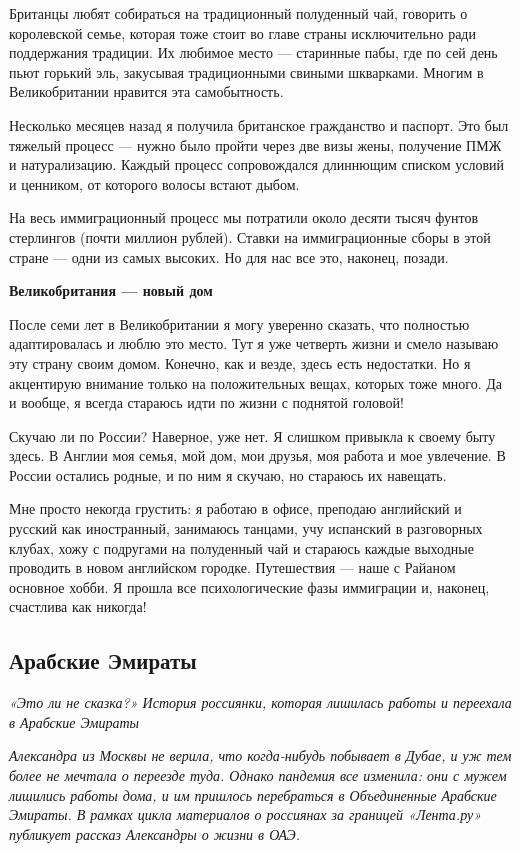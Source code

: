 Британцы любят собираться на традиционный полуденный чай, говорить о королевской семье, которая тоже стоит во главе страны исключительно ради поддержания традиции. Их любимое место — старинные пабы, где по сей день пьют горький эль, закусывая традиционными свиными шкварками. Многим в Великобритании нравится эта самобытность.

Несколько месяцев назад я получила британское гражданство и паспорт. Это был тяжелый процесс — нужно было пройти через две визы жены, получение ПМЖ и натурализацию. Каждый процесс сопровождался длиннющим списком условий и ценником, от которого волосы встают дыбом.

На весь иммиграционный процесс мы потратили около десяти тысяч фунтов стерлингов (почти миллион рублей). Ставки на иммиграционные сборы в этой стране — одни из самых высоких. Но для нас все это, наконец, позади.

\textbf{Великобритания — новый дом}

После семи лет в Великобритании я могу уверенно сказать, что полностью адаптировалась и люблю это место. Тут я уже четверть жизни и смело называю эту страну своим домом. Конечно, как и везде, здесь есть недостатки. Но я акцентирую внимание только на положительных вещах, которых тоже много. Да и вообще, я всегда стараюсь идти по жизни с поднятой головой!

Скучаю ли по России? Наверное, уже нет. Я слишком привыкла к своему быту здесь. В Англии моя семья, мой дом, мои друзья, моя работа и мое увлечение. В России остались родные, и по ним я скучаю, но стараюсь их навещать.

Мне просто некогда грустить: я работаю в офисе, преподаю английский и русский как иностранный, занимаюсь танцами, учу испанский в разговорных клубах, хожу с подругами на полуденный чай и стараюсь каждые выходные проводить в новом английском городке. Путешествия — наше с Райаном основное хобби. Я прошла все психологические фазы иммиграции и, наконец, счастлива как никогда!

\newpage
\subsection{Арабские Эмираты}

\textit{«Это ли не сказка?» История россиянки, которая лишилась работы и переехала в Арабские Эмираты}

\textit{Александра из Москвы не верила, что когда-нибудь побывает в Дубае, и уж тем более не мечтала о переезде туда. Однако пандемия все изменила: они с мужем лишились работы дома, и им пришлось перебраться в Объединенные Арабские Эмираты. В рамках цикла материалов о россиянах за границей «Лента.ру» публикует рассказ Александры о жизни в ОАЭ.}

